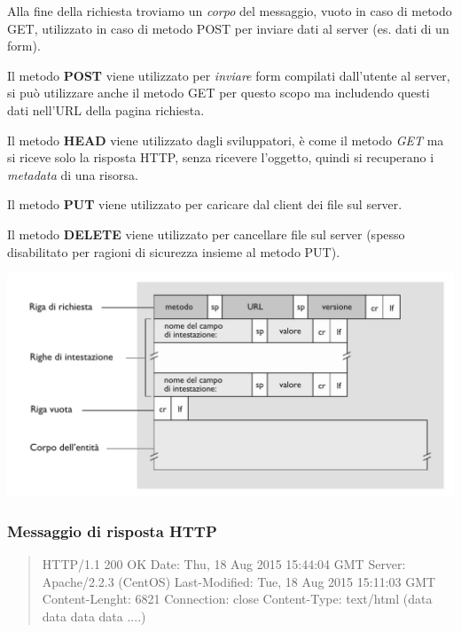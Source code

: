 Alla fine della richiesta troviamo un \textit{corpo} del messaggio, vuoto in caso di metodo GET, utilizzato in caso di metodo POST per inviare dati al server (es. dati di un form).

Il metodo \textbf{POST} viene utilizzato per \textit{inviare} form compilati dall'utente al server, si può utilizzare anche il metodo GET per questo scopo ma includendo questi dati nell'URL della pagina richiesta.

Il metodo \textbf{HEAD} viene utilizzato dagli sviluppatori, è come il metodo \textit{GET} ma si riceve solo la risposta HTTP, senza ricevere l'oggetto, quindi si recuperano i \textit{metadata} di una risorsa.

Il metodo \textbf{PUT} viene utilizzato per caricare dal client dei file sul server.

Il metodo \textbf{DELETE} viene utilizzato per cancellare file sul server (spesso disabilitato per ragioni di sicurezza insieme al metodo PUT).

\includegraphics[width=\textwidth]{./img/richiestaHTTP.png}

\subsubsection*{Messaggio di risposta HTTP}
\begin{quote}
  HTTP/1.1 200 OK \newline
  Date: Thu, 18 Aug 2015 15:44:04 GMT \newline
  Server: Apache/2.2.3 (CentOS) \newline
  Last-Modified: Tue, 18 Aug 2015 15:11:03 GMT \newline
  Content-Lenght: 6821 \newline
  Connection: close \newline
  Content-Type: text/html \newline
  (data data data data ....)
\end{quote}

